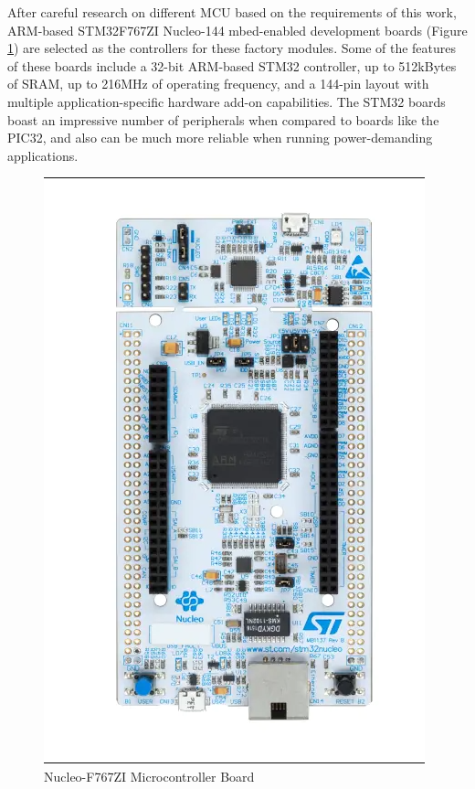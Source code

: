 After careful research on different \acrshort{MCU} based on the requirements of this work, ARM-based STM32F767ZI Nucleo-144 mbed-enabled development boards (Figure \ref{fig:nucleo}) are selected as the controllers for these factory modules. Some of the features of these boards include a 32-bit ARM-based STM32 controller, up to 512kBytes of SRAM, up to 216MHz of operating frequency, and a 144-pin layout with multiple application-specific hardware add-on capabilities. The STM32 boards boast an impressive number of peripherals when compared to boards like the PIC32, and also can be much more reliable when running power-demanding applications.
\begin{figure}[h]
    \centering
    \includegraphics[scale=0.4]{images/NucleoBoard.png}
    \caption{Nucleo-F767ZI Microcontroller Board \cite{ARM_2017}}
    \label{fig:nucleo}
\end{figure}

